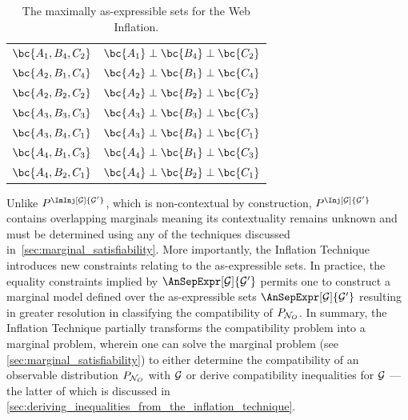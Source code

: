 \documentclass[aps, 10pt, english, twoside, pra, nofootinbib, tightenlines, longbibliography, superscriptaddress]{revtex4-1}
\begin{document}
\begin{nscenter}
\begin{table}
{\begin{tabular}{|c|c|}
                $\bc{A_1, B_4, C_2}$ & $\bc{A_1} \ancestralindep \bc{B_4} \ancestralindep \bc{C_2}$ \\
                $\bc{A_2, B_1, C_4}$ & $\bc{A_2} \ancestralindep \bc{B_1} \ancestralindep \bc{C_4}$ \\
                $\bc{A_2, B_2, C_2}$ & $\bc{A_2} \ancestralindep \bc{B_2} \ancestralindep \bc{C_2}$ \\
                $\bc{A_3, B_3, C_3}$ & $\bc{A_3} \ancestralindep \bc{B_3} \ancestralindep \bc{C_3}$ \\
                $\bc{A_3, B_4, C_1}$ & $\bc{A_3} \ancestralindep \bc{B_4} \ancestralindep \bc{C_1}$ \\
                $\bc{A_4, B_1, C_3}$ & $\bc{A_4} \ancestralindep \bc{B_1} \ancestralindep \bc{C_3}$ \\
                $\bc{A_4, B_2, C_1}$ & $\bc{A_4} \ancestralindep \bc{B_2} \ancestralindep \bc{C_1}$ \\
                \hline
            \end{tabular}
            \caption{The maximally as-expressible sets for the Web Inflation.
            \label{tab:asexpr_triangle_structure_web}}
        }
        \end{table}
    \end{nscenter}

    Unlike $\prob^{\ImInj[\graph]{\graph'}}$, which is non-contextual by construction, $\prob^{\Inj[\graph]{\graph'}}$ contains overlapping marginals meaning its contextuality remains unknown and must be determined using any of the techniques discussed in~\cref{sec:marginal_satisfiability}. More importantly, the Inflation Technique introduces new constraints relating to the as-expressible sets. In practice, the equality constraints implied by $\AnSepExpr[\graph]{\graph'}$ permits one to construct a marginal model defined over the as-expressible sets $\AnSepExpr[\graph]{\graph'}$ resulting in greater resolution in classifying the compatibility of $\prob[\nodes_O]$. In summary, the Inflation Technique partially transforms the compatibility problem into a marginal problem, wherein one can solve the marginal problem (see \cref{sec:marginal_satisfiability}) to either determine the compatibility of an observable distribution $\prob[\nodes_O]$ with $\mathcal{G}$ or derive compatibility inequalities for $\mathcal{G}$ --- the latter of which is discussed in \cref{sec:deriving_inequalities_from_the_inflation_technique}.


\end{document}
